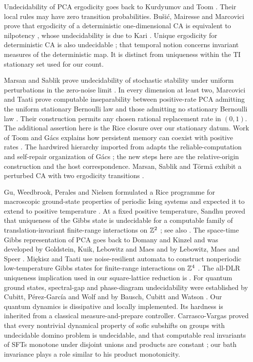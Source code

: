 Undecidability of PCA ergodicity goes back to Kurdyumov and Toom \cite{kurdyumov,toom-undecidable,toom-continuous,toom-book,gacs-survey}. Their local rules may have zero transition probabilities. Bu\v{s}i\'c, Mairesse and Marcovici prove that ergodicity of a deterministic one-dimensional CA is equivalent to nilpotency \cite{busic-mairesse-marcovici}, whose undecidability is due to Kari \cite{kari-nilpotency}. Unique ergodicity for deterministic CA is also undecidable \cite{torma}; that temporal notion concerns invariant measures of the deterministic map. It is distinct from uniqueness within the TI stationary set used for our count.

Marsan and Sablik prove undecidability of stochastic stability under uniform perturbations in the zero-noise limit \cite{marsan-sablik}. In every dimension at least two, Marcovici and Taati prove computable inseparability between positive-rate PCA admitting the uniform stationary Bernoulli law and those admitting no stationary Bernoulli law \cite[Theorem~3]{marcovici-taati}. Their construction permits any chosen rational replacement rate in $(0,1)$. The additional assertion here is the Rice closure over our stationary datum. Work of Toom and G\'acs explains how persistent memory can coexist with positive rates \cite{Toom80,gacs1986,gacs2001}. The hardwired hierarchy imported from \cite{DMline} adapts the reliable-computation and self-repair organization of G\'acs \cite{gacs1986}; the new steps here are the relative-origin construction and the host correspondence. Marsan, Sablik and T\"orm\"a exhibit a perturbed CA with two ergodicity transitions \cite{marsan-sablik-torma}.

Gu, Weedbrook, Perales and Nielsen formulated a Rice programme for macroscopic ground-state properties of periodic Ising systems and expected it to extend to positive temperature \cite{gu-et-al}. At a fixed positive temperature, Sandhu proved that uniqueness of the Gibbs state is undecidable for a computable family of translation-invariant finite-range interactions on $\mathbb Z^2$ \cite{sandhu}; see also \cite{DMthermal}. The space-time Gibbs representation of PCA goes back to Domany and Kinzel \cite{domany-kinzel} and was developed by Goldstein, Kuik, Lebowitz and Maes \cite{goldstein-kuik-lebowitz-maes} and by Lebowitz, Maes and Speer \cite{lebowitz-maes-speer}. Mi\k{e}kisz and Taati use noise-resilient automata to construct nonperiodic low-temperature Gibbs states for finite-range interactions on $\mathbb Z^4$ \cite{miekisz-taati}. The all-DLR uniqueness implication used in our square-lattice reduction is \cite[Theorem~3.1]{DMspacetime}. For quantum ground states, spectral-gap and phase-diagram undecidability were established by Cubitt, P\'erez-Garc\'ia and Wolf and by Bausch, Cubitt and Watson \cite{cubitt-perez-garcia-wolf,bausch-cubitt-watson}. Our quantum dynamics is dissipative and locally implemented. Its hardness is inherited from a classical measure-and-prepare controller. Carrasco-Vargas proved that every nontrivial dynamical property of sofic subshifts on groups with undecidable domino problem is undecidable, and that computable real invariants of SFTs monotone under disjoint unions and products are constant \cite{carrasco-vargas}; our bath invariance plays a role similar to his product monotonicity.

